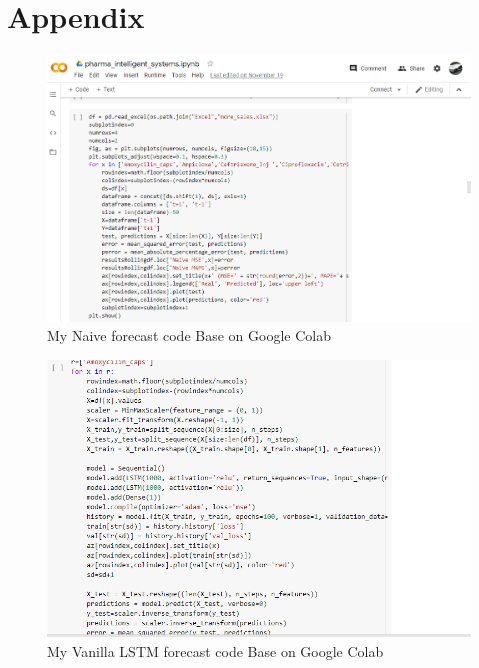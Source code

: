 \documentclass[12pt]{report}
\begin{document}



\appendix

\chapter{Appendix}


\begin{figure}[H]%
  \begin {center}
  \includegraphics[width=1\textwidth]{images/NaiveCode.PNG}
  \caption{My Naive forecast code Base on Google Colab}
  \label{fig:ecg}
  \end {center}
\end{figure}
  
\begin{figure}[H]%
  \begin {center}
  \includegraphics[width=1\textwidth]{images/VanillaLSTM.PNG}
  \caption{My Vanilla LSTM forecast code Base on Google Colab}
  \label{fig:ecg}
  \end {center}
\end{figure}
\end{document}
